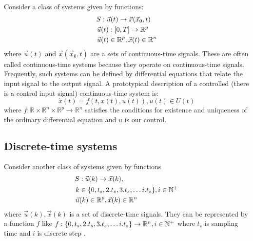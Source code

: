 
\noindent Consider a class of systems given by functions:
\begin{equation}
    \begin{split}
    S&: \vec{u}(t)  \to \vec{x}(\vec{x}_0,t) \\
    \vec{u}&(t): [0,T] \to \mathbb{R}^p \\
    \vec{u}&(t)\in \mathbb{R}^p , \vec{x}(t) \in \mathbb{R}^n \\
    \end{split}
\end{equation}
where $\vec{u}(t)$ and  $\vec{x}(\vec{x}_0,t)$ are a sets of continuous-time signals.
These are often called continuous-time systems because they operate on
continuous-time signals. Frequently, such systems can be defined by differential
equations that relate the input signal to the output signal.
A prototypical description of a controlled (there is a control input signal)
continuous-time system is:
\begin{equation}\label{eq:nonlinearsystem}
    \dot{x}(t) = f(t,x(t),u(t)), u(t) \in U(t)
\end{equation}
where $f:\mathbb{R}\times\mathbb{R}^n\times\mathbb{R}^p\to\mathbb{R}^n$
satisfies the conditions for existence
and uniqueness of the ordinary differential equation and $u$ is our control\cite{butcher1987numerical}.

\subsection{Discrete-time systems}
\noindent
\noindent Consider another class of systems given by functions
\begin{equation}\label{eq:Discretegenericuavmodel}
    \begin{split}
    S&: \vec{u}(k)  \to \vec{x}(k), \\
    k& \in \{0, t_s, 2.t_s, 3.t_s, \dots i.t_s\}, i \in \mathbb{N}^+\\
    \vec{u}&(k)\in \mathbb{R}^p , \vec{x}(k) \in \mathbb{R}^n\\
    \end{split}
\end{equation}
where $\vec{u}(k), \vec{x}(k)$ is a set of discrete-time signals. They can be represented by a function $f$ like $f:\{0, t_s, 2.t_s, 3.t_s, \dots i.t_s\} \to \mathbb{R}^n,  i \in \mathbb{N}^+$ where $t_s$ is sampling time and $i$ is discrete step \cite{shampine1997matlab}.

